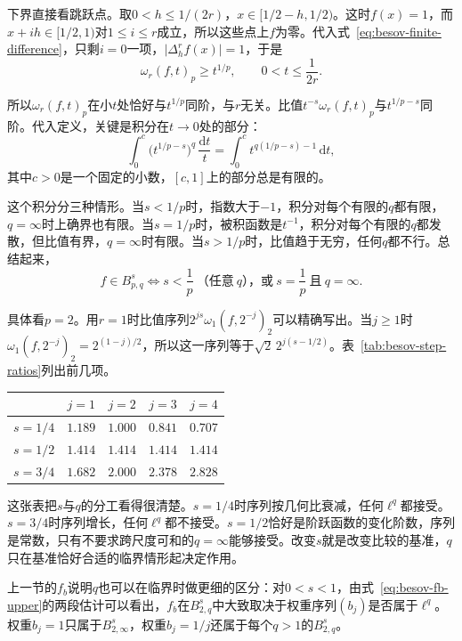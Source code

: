 下界直接看跳跃点。取$0<h\leq1/(2r)$，$x\in[1/2-h,1/2)$。这时$f(x)=1$，而$x+ih\in[1/2,1)$对$1\leq i\leq r$成立，所以这些点上$f$为零。代入式~\eqref{eq:besov-finite-difference}，只剩$i=0$一项，$\lvert\Delta_h^rf(x)\rvert=1$，于是
\[
 \omega_r(f,t)_p\geq t^{1/p},\qquad0<t\leq\frac{1}{2r}.
\]

所以$\omega_r(f,t)_p$在小$t$处恰好与$t^{1/p}$同阶，与$r$无关。比值$t^{-s}\omega_r(f,t)_p$与$t^{1/p-s}$同阶。代入定义，关键是积分在$t\to0$处的部分：
\[
 \int_0^{c}\bigl(t^{1/p-s}\bigr)^q\,\frac{\mathrm dt}{t}=\int_0^{c}t^{q(1/p-s)-1}\,\mathrm dt ,
\]
其中$c>0$是一个固定的小数，$[c,1]$上的部分总是有限的。

这个积分分三种情形。当$s<1/p$时，指数大于$-1$，积分对每个有限的$q$都有限，$q=\infty$时上确界也有限。当$s=1/p$时，被积函数是$t^{-1}$，积分对每个有限的$q$都发散，但比值有界，$q=\infty$时有限。当$s>1/p$时，比值趋于无穷，任何$q$都不行。总结起来，
\begin{equation}
 f\in B^s_{p,q}\iff s<\frac1p\ \text{（任意}\ q\text{），或}\ s=\frac1p\ \text{且}\ q=\infty .
 \label{eq:besov-step-membership}
\end{equation}

具体看$p=2$。用$r=1$时比值序列$2^{js}\omega_1(f,2^{-j})_2$可以精确写出。当$j\geq1$时$\omega_1(f,2^{-j})_2=2^{(1-j)/2}$，所以这一序列等于$\sqrt2\,2^{j(s-1/2)}$。表~\ref{tab:besov-step-ratios}列出前几项。

\begin{BookInlineTable}
  \centering
  \begin{tabular}{@{}ccccc@{}}
    \toprule
    & $j=1$ & $j=2$ & $j=3$ & $j=4$\\
    \midrule
    $s=1/4$ & $1.189$ & $1.000$ & $0.841$ & $0.707$\\
    $s=1/2$ & $1.414$ & $1.414$ & $1.414$ & $1.414$\\
    $s=3/4$ & $1.682$ & $2.000$ & $2.378$ & $2.828$\\
    \bottomrule
  \end{tabular}
  \caption{周期阶跃在$p=2$、$r=1$时的比值序列$2^{js}\omega_1(f,2^{-j})_2$。}
  \label{tab:besov-step-ratios}
\end{BookInlineTable}

这张表把$s$与$q$的分工看得很清楚。$s=1/4$时序列按几何比衰减，任何$\ell^q$都接受。$s=3/4$时序列增长，任何$\ell^q$都不接受。$s=1/2$恰好是阶跃函数的变化阶数，序列是常数，只有不要求跨尺度可和的$q=\infty$能够接受。改变$s$就是改变比较的基准，$q$只在基准恰好合适的临界情形起决定作用。

上一节的$f_b$说明$q$也可以在临界时做更细的区分：对$0<s<1$，由式~\eqref{eq:besov-fb-upper}的两段估计可以看出，$f_b$在$B^s_{2,q}$中大致取决于权重序列$(b_j)$是否属于$\ell^q$。权重$b_j=1$只属于$B^s_{2,\infty}$，权重$b_j=1/j$还属于每个$q>1$的$B^s_{2,q}$。

